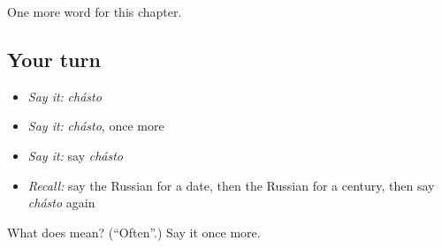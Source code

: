 \begin{grammarlens}[title={What you've built}]
One more word for this chapter.
\end{grammarlens}

\subsection*{Your turn}
\begin{itemize}
\raggedright
  \item \emph{Say it:} \emph{chásto}
  \item \emph{Say it:} \emph{chásto}, once more
  \item \emph{Say it:} say \emph{chásto}
  \item \emph{Recall:} say the Russian for a date, then the Russian for a century, then say \emph{chásto} again
\end{itemize}

\begin{tcolorbox}[breakable,colback=teal!4,colframe=teal!35!black,title={Before you move on}]
What does  mean? (\textquotedblleft{}Often\textquotedblright{}.) Say it once more.
\end{tcolorbox}
